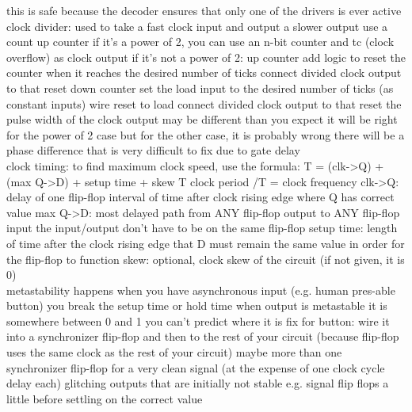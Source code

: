\documentclass{article}
\begin{document}
\begin{multicols*}{2}
\begin{outline}[compactitem]
\2         this is safe because the decoder ensures that only one of the drivers is ever active
\noindent \\ 
\0 clock divider:
\1     used to take a fast clock input and output a slower output
\1     use a count up counter
\1     if it's a power of 2, you can use an n-bit counter and tc (clock overflow) as clock output
\1     if it's not a power of 2:
\2         up counter
\3             add logic to reset the counter when it reaches the desired number of ticks
\3             connect divided clock output to that reset
\2         down counter
\3             set the load input to the desired number of ticks (as constant inputs)
\3             wire reset to load
\3             connect divided clock output to that reset
\1     the pulse width of the clock output may be different than you expect
\2         it will be right for the power of 2 case
\2         but for the other case, it is probably wrong
\1     there will be a phase difference that is very difficult to fix
\2         due to gate delay
\noindent \\ 
\0 clock timing:
\1     to find maximum clock speed, use the formula:
\2         T = (clk->Q) + (max Q->D) + setup time + skew
\3             T  clock period
/T = clock frequency
\3             clk->Q: delay of one flip-flop
\4                 interval of time after clock rising edge where Q has correct value
\3             max Q->D: most delayed path from ANY flip-flop output to ANY flip-flop input
\4                 the input/output don't have to be on the same flip-flop
\3             setup time:
\4                 length of time after the clock rising edge that D must remain the same value in order for the flip-flop to function
\3             skew: optional, clock skew of the circuit
\4                 (if not given, it is 0)
\noindent \\ 
\0 metastability
\1     happens when
\2         you have asynchronous input (e.g. human pres-able button)
\2         you break the setup time or hold time
\1     when output is metastable it is somewhere between 0 and 1
\2         you can't predict where it is
\1     fix for button:
\2         wire it into a synchronizer flip-flop and then to the rest of your circuit
\3             (because flip-flop uses the same clock as the rest of your circuit)
\2         maybe more than one synchronizer flip-flop for a very clean signal
\3             (at the expense of one clock cycle delay each)
\0 glitching
\1     outputs that are initially not stable
\2         e.g. signal flip flops a little before settling on the correct value

\end{outline}
\end{multicols*}
\end{document}

